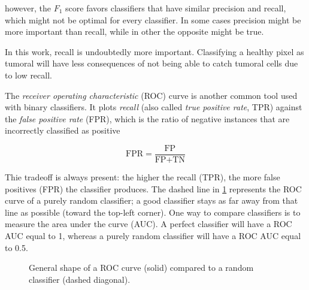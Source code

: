 however, the $F_1$ score favors classifiers that have similar precision and recall, which might not be optimal for every classifier. In some cases precision might be more important than recall, while in other the opposite might be true.

In this work, recall is undoubtedly more important. Classifying a healthy pixel as tumoral will have less consequences of not being able to catch tumoral cells due to low recall.

The \textit{receiver operating characteristic} (ROC) curve is another common tool used with binary classifiers. It plots \textit{recall} (also called \textit{true positive rate}, TPR) against the \textit{false positive rate} (FPR), which is the ratio of negative instances that are incorrectly classified as positive

\begin{equation}
    \text{FPR} = \frac{\text{FP}}{\text{FP}+\text{TN}}
\end{equation}

Thie tradeoff is always present: the higher the recall (TPR), the more false positives (FPR) the classifier produces. The dashed line in \cref{fig:roc_curve} represents the ROC curve of a purely random classifier; a good classifier stays as far away from that line as possible (toward
the top-left corner).
One way to compare classifiers is to measure the area under the curve (AUC). A perfect classifier will have a ROC AUC equal to 1, whereas a purely random classifier will have a ROC AUC equal to 0.5.

\begin{figure}[ht]
    \centering
    \caption{General shape of a ROC curve (solid) compared to a random classifier (dashed diagonal).}
    \label{fig:roc_curve}
\end{figure}